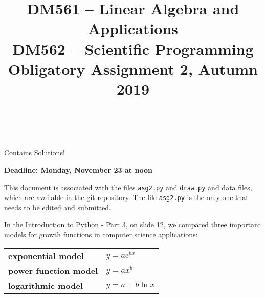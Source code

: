 \documentclass[a4paper,10pt]{article}
\title{%
\begin{flushleft}
  DM561 -- Linear Algebra and Applications\\
  DM562 -- Scientific Programming\\[0.3cm]
{\Large Obligatory Assignment 2, Autumn 2019} %
\\
\hrulefill
\\[-1.8cm]
\end{flushleft}
}
\author{}
\date{}
\begin{document}
\maketitle



\begin{solution}
Contains Solutions!
\end{solution}



\begin{center}
  {\bf Deadline: Monday, November 23 at noon}
\end{center}



This document is associated with the files \lstinline{asg2.py} and
\lstinline{draw.py} and data files, which are available in the git
repository. The file \lstinline{asg2.py} is the only one that needs to be
edited and submitted.

\bigskip

%
%
%
%
%
%
%
%

In the Introduction to Python - Part 3, on slide 12, we compared three
important models for growth functions in computer science applications:

\begin{table}[h]
  \begin{tabular}{ll}
    \textbf{exponential model}&$y=ae^{bx}$\\
    \textbf{power function model}&$y=ax^b$\\
    \textbf{logarithmic model}&$y=a+b\ln x$
  \end{tabular}
\end{table}
\end{document}

